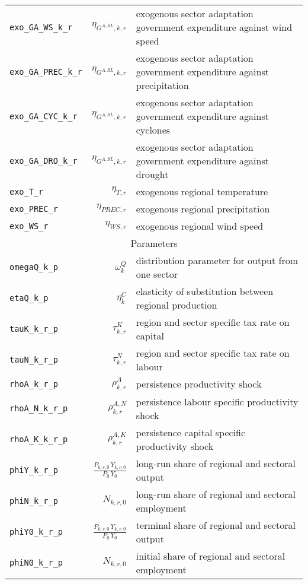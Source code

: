 \begin{center}
\begin{longtable}{lrl}
\texttt{exo\_GA\_WS\_k\_r} & ${\eta_{G^{A,SL},k,r}}$ & exogenous sector adaptation government expenditure against wind speed\\
\texttt{exo\_GA\_PREC\_k\_r} & ${\eta_{G^{A,SL},k,r}}$ & exogenous sector adaptation government expenditure against precipitation\\
\texttt{exo\_GA\_CYC\_k\_r} & ${\eta_{G^{A,SL},k,r}}$ & exogenous sector adaptation government expenditure against cyclones\\
\texttt{exo\_GA\_DRO\_k\_r} & ${\eta_{G^{A,SL},k,r}}$ & exogenous sector adaptation government expenditure against drought\\
\texttt{exo\_T\_r} & ${\eta_{T,r}}$ & exogenous regional temperature\\
\texttt{exo\_PREC\_r} & ${\eta_{PREC,r}}$ & exogenous regional precipitation\\
\texttt{exo\_WS\_r} & ${\eta_{WS,r}}$ & exogenous regional wind speed\\
\hline%
\multicolumn{3}{c}{Parameters}\\%
\hline%
\texttt{omegaQ\_k\_p} & ${\omega^{Q}_{k}}$ & distribution parameter for output from one sector\\
\texttt{etaQ\_k\_p} & ${\eta^{C}_{k}}$ & elasticity of substitution between regional production\\
\texttt{tauK\_k\_r\_p} & ${\tau^{K}_{k,r}}$ & region and sector specific tax rate on capital\\
\texttt{tauN\_k\_r\_p} & ${\tau^{N}_{k,r}}$ & region and sector specific tax rate on labour\\
\texttt{rhoA\_k\_r\_p} & ${\rho^{A}_{k,r}}$ & persistence productivity shock\\
\texttt{rhoA\_N\_k\_r\_p} & ${\rho^{A,N}_{k,r}}$ & persistence labour specific productivity shock\\
\texttt{rhoA\_K\_k\_r\_p} & ${\rho^{A,K}_{k,r}}$ & persistence capital specific productivity shock\\
\texttt{phiY\_k\_r\_p} & $\frac{P_{k,r,0} \, Y_{k,r,0}}{P_{0} \, Y_{0}}$ & long-run share of regional and sectoral output\\
\texttt{phiN\_k\_r\_p} & ${N_{k,r,0}}$ & long-run share of regional and sectoral employment\\
\texttt{phiY0\_k\_r\_p} & $\frac{P_{k,r,0} \, Y_{k,r,0}}{P_{0} \, Y_{0}}$ & terminal share of regional and sectoral output\\
\texttt{phiN0\_k\_r\_p} & ${N_{k,r,0}}$ & initial share of regional and sectoral employment\\

\end{longtable}
\end{center}
